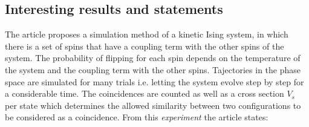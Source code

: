 \documentclass{article}
\begin{document}
\subsection{Interesting results and statements}
The article proposes a simulation method of a kinetic Ising system, in which there is a set of spins that have a coupling term with the other spins of the system. The probability of flipping for each spin depends on the temperature of the system and the coupling term with the other spins.  Tajectories in the phase space are simulated for many trials i.e. letting the system evolve step by step for a considerable time. The coincidences are counted as well as a cross section $V_s$ per state which determines the allowed similarity between two configurations to be considered as a coincidence. From this \textit{experiment} the article states:
\begin{itemize}


\end{itemize}
\end{document}
